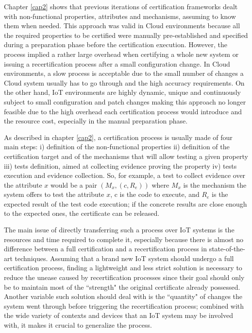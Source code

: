 
Chapter \ref{cap2} shows that previous iterations of certification frameworks dealt with non-functional properties, attributes and mechanisms, assuming to know them when needed. This approach was valid in Cloud environments because all the required properties to be certified were manually pre-established and specified during a preparation phase before the certification execution. However, the process implied a rather large overhead when certifying a whole new system or issuing a recertification process after a small configuration change. In Cloud environments, a slow process is acceptable due to the small number of changes a Cloud system usually has to go through and the high accuracy requirements. On the other hand, IoT environments are highly dynamic, unique and continuously subject to small configuration and patch changes making this approach no longer feasible due to the high overhead each certification process would introduce and the resource cost, especially in the manual preparation phase.

As described in chapter \ref{cap2}, a certification process is usually made of four main steps: i) definition of the non-functional properties ii) definition of the certification target and of the mechanisms that will allow testing a given property iii) tests definition, aimed at collecting evidence proving the property iv) tests execution and evidence collection. So, for example, a test to collect evidence over the attribute \(x\) would be a pair \( (M_x, (c, R_e) ) \) where \(M_x\) is the mechanism the system offers to test the attribute \(x\), c is the code to execute, and \(R_e\) is the expected result of the test code execution; if the concrete results are close enough to the expected ones, the certificate can be released.

The main issue of directly transferring such a process over IoT systems is the resources and time required to complete it, especially because there is almost no difference between a full certification and a recertification process in state-of-the-art techniques. Assuming that a brand new IoT system should undergo a full certification process, finding a lightweight and less strict solution is necessary to reduce the unease caused by recertification processes since their goal should only be to maintain most of the ``strength" the original certificate already possessed. Another variable such solution should deal with is the ``quantity" of changes the system went through before triggering the recertification process; combined with the wide variety of contexts and devices that an IoT system may be involved with, it makes it crucial to generalize the process.

